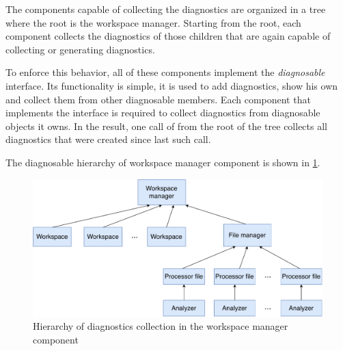 The components capable of collecting the diagnostics are organized in a tree where the root is the workspace manager. Starting from the root, each component collects the diagnostics of those children that are again capable of collecting or generating diagnostics.

To enforce this behavior, all of these components implement the \emph{diagnosable} interface. Its functionality is simple, it is used to add diagnostics, show his own and collect them from other diagnosable members. Each component that implements the interface is required to collect diagnostics from diagnosable objects it owns. In the result, one call of  from the root of the tree collects all diagnostics that were created since last such call.

The diagnosable hierarchy of workspace manager component is shown in \cref{diagnosable_hierarchy}.

\begin{figure}
	\centering
	\includegraphics[width=\textwidth]{img/diagnosable_hierarchy}
	\caption{Hierarchy of diagnostics collection in the workspace manager component}
	\label{diagnosable_hierarchy}
\end{figure}